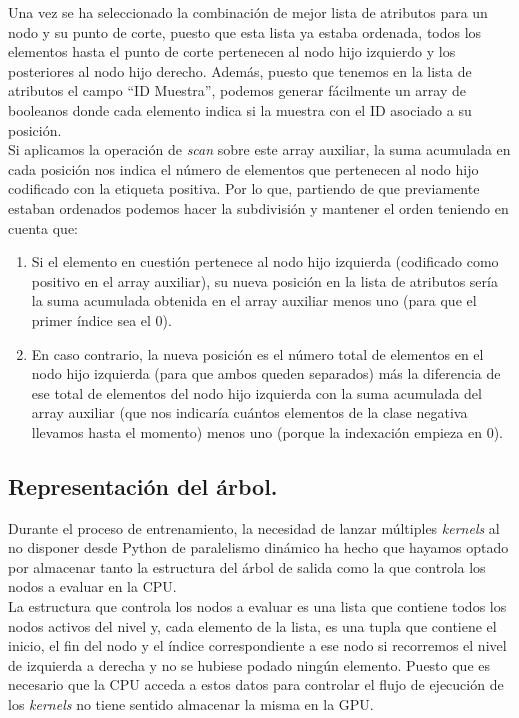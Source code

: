  Una vez se ha seleccionado la combinación de mejor lista de atributos para un nodo y su punto de corte, puesto que esta lista ya estaba ordenada, todos los elementos hasta el punto de corte pertenecen al nodo hijo izquierdo y los posteriores al nodo hijo derecho. Además, puesto que tenemos en la lista de atributos el campo ``ID Muestra'', podemos generar fácilmente un array de booleanos donde cada elemento indica si la muestra con el ID asociado a su posición.\\

 Si aplicamos la operación de \textit{scan} sobre este array auxiliar, la suma acumulada en cada posición nos indica el número de elementos que pertenecen al nodo hijo codificado con la etiqueta positiva. Por lo que, partiendo de que previamente estaban ordenados podemos hacer la subdivisión y mantener el orden teniendo en cuenta que:\\

 \begin{enumerate}
    \item Si el elemento en cuestión pertenece al nodo hijo izquierda (codificado como positivo en el array auxiliar), su nueva posición en la lista de atributos sería la suma acumulada obtenida en el array auxiliar menos uno (para que el primer índice sea el 0).
    \item En caso contrario, la nueva posición es el número total de elementos en el nodo hijo izquierda (para que ambos queden separados) más la diferencia de ese total de elementos del nodo hijo izquierda con la suma acumulada del array auxiliar (que nos indicaría cuántos elementos de la clase negativa llevamos hasta el momento) menos uno (porque la indexación empieza en 0).
 \end{enumerate}

\subsection{Representación del árbol.}
Durante el proceso de entrenamiento, la necesidad de lanzar múltiples \textit{kernels} al no disponer desde Python de paralelismo dinámico ha hecho que hayamos optado por almacenar tanto la estructura del árbol de salida como la que controla los nodos a evaluar en la CPU.\\

La estructura que controla los nodos a evaluar es una lista que contiene todos los nodos activos del nivel y, cada elemento de la lista, es una tupla que contiene el inicio, el fin del nodo y el índice correspondiente a ese nodo si recorremos el nivel de izquierda a derecha y no se hubiese podado ningún elemento. Puesto que es necesario que la CPU acceda a estos datos para controlar el flujo de ejecución de los \textit{kernels} no tiene sentido almacenar la misma en la GPU. \\

